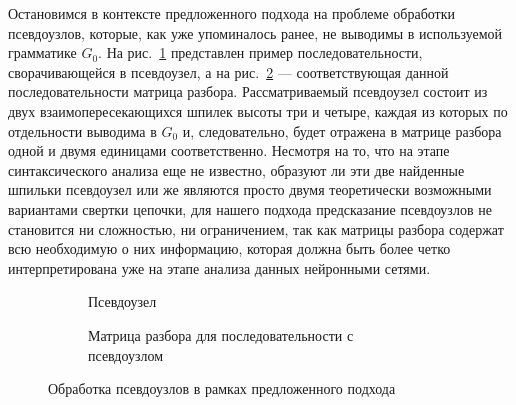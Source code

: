 Остановимся в контексте предложенного подхода на проблеме обработки псевдоузлов, которые, как уже упоминалось ранее, не выводимы в используемой грамматике $G_0$. На рис.~\ref{pk_a} представлен пример последовательности, сворачивающейся в псевдоузел, а на рис.~\ref{pk_b} --- соответствующая данной последовательности матрица разбора. Рассматриваемый псевдоузел состоит из двух взаимопересекающихся шпилек высоты три и четыре, каждая из которых по отдельности выводима в $G_0$ и, следовательно, будет отражена в матрице разбора одной и двумя единицами соответственно. Несмотря на то, что на этапе синтаксического анализа еще не известно, образуют ли эти две найденные шпильки псевдоузел или же являются просто двумя теоретически возможными вариантами свертки цепочки, для нашего подхода предсказание псевдоузлов не становится ни сложностью, ни ограничением, так как матрицы разбора содержат всю необходимую о них информацию, которая должна быть более четко интерпретирована уже на этапе анализа данных нейронными сетями.

\captionsetup[subfigure]{justification=centering}
\begin{figure}[h]
\centering
\begin{subfigure}{.3\textwidth}
  \centering
  \caption{Псевдоузел}
  \label{pk_a}
\end{subfigure}%
\begin{subfigure}{.7\textwidth}
  \centering
  \caption{Матрица разбора для последовательности с псевдоузлом}
  \label{pk_b}
\end{subfigure}
\caption{Обработка псевдоузлов в рамках предложенного подхода}
\label{pk}
\end{figure}

